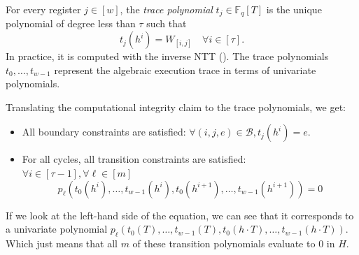\documentclass[../../book]{subfiles}
\begin{document}
For every register $j \in [w]$, the \emph{trace polynomial} $t_j \in \mathbb{F}_q[T]$ is the unique polynomial of degree less than $\tau$ such that
\begin{equation*}
  t_j(h^i) = W_{[i,j]} \quad \forall i \in [\tau].
\end{equation*}
In practice, it is computed with the inverse NTT (). The trace polynomials
$t_0, \ldots, t_{w-1}$ represent the algebraic execution trace in terms of univariate polynomials.

Translating the computational integrity claim to the trace polynomials, we get:
\begin{itemize}
  \item All boundary constraints are satisfied: $\forall (i,j,e)\in \mathcal{B}, t_j(h^i)=e$.
  \item For all cycles, all transition constraints are satisfied: $\forall i\in [\tau-1],\forall \ell\in[m]$
  \begin{equation*}
    p_\ell(t_0(h^i),\dots,t_{w-1}(h^i),t_0(h^{i+1}),\dots,t_{w-1}(h^{i+1}))=0
  \end{equation*}
\end{itemize}
If we look at the left-hand side of the equation, we can see that it corresponds to a univariate polynomial $p_\ell(t_0(T),\dots,t_{w-1}(T),t_0(h\cdot T),\dots,t_{w-1}(h\cdot T))$. Which just means that all $m$ of these transition polynomials evaluate to $0$ in $H$.
\end{document}
